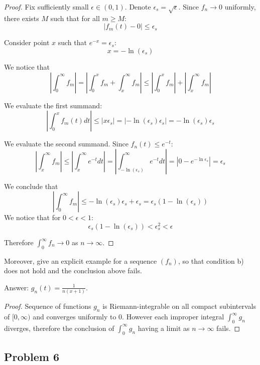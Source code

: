 \documentclass{article}
\begin{document}
\begin{proof}

Fix sufficiently small $\epsilon \in (0,1)$. Denote $\epsilon_s = \sqrt{\epsilon}$. Since $f_n \to 0$ uniformly, there exists $M$ such that for all $m \geq M$:
\[ | f_m(t) - 0 | \leq \epsilon_s \]

Consider point $x$ such that $e^{-x} = \epsilon_s$:
\[ x = - \ln(\epsilon_s) \]

We notice that
\[
\left| \int_0^\infty f_m \right| 
= \left| \int_0^x f_m + \int_x^\infty f_m \right|
\leq \left| \int_0^x f_m \right| + \left| \int_x^\infty f_m \right|
\]

We evaluate the first summand:
\[
\left| \int_0^x f_m(t) dt \right| \leq | x \epsilon_s | 
= | - \ln(\epsilon_s) \epsilon_s | 
=  - \ln(\epsilon_s) \epsilon_s
\]

We evaluate the second summand. Since $f_n(t) \leq e^{-t}$:
\[
\left| \int_x^\infty f_m \right| 
\leq \left | \int_x^\infty e^{-t} dt \right|
= \left| \int_{- \ln(\epsilon_s)}^\infty e^{-t} dt \right|
= \left| 0 - e^{ - \ln \epsilon_s} \right| = \epsilon_s
\]

We conclude that 
\[
\left| \int_0^\infty f_m \right| 
\leq - \ln(\epsilon_s) \epsilon_s + \epsilon_s
= \epsilon_s (1-\ln(\epsilon_s))
\]
We notice that for $0 < \epsilon < 1$:
\[ \epsilon_s (1-\ln(\epsilon_s)) < \epsilon_s^2 < \epsilon \]

Therefore $\int_0^\infty f_n \to 0$ as $n \to \infty$.

\end{proof}

\begin{tcolorbox}
Moreover, give an explicit example for a sequence $(f_n)$, so that condition b) does not hold and the conclusion above fails.
\end{tcolorbox}

Answer: $g_n(t) = \frac{1}{n(x+1)}$.

\begin{proof}

Sequence of functions $g_n$ is Riemann-integrable on all compact subintervals of $[0,\infty)$ and converges uniformly to $0$.
However each improper integral $\int_0^\infty g_n$ diverges, therefore the conclusion of $\int_0^\infty g_n$ having a limit as $n \to \infty$ fails.

\end{proof}


\subsection*{Problem 6}
\end{document}
